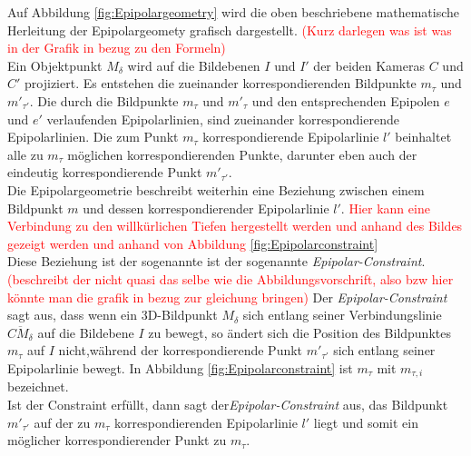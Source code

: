 Auf Abbildung \ref{fig:Epipolargeometry} wird die oben beschriebene mathematische Herleitung der Epipolargeomety grafisch dargestellt.  \textcolor{red}{(Kurz darlegen was ist was in der Grafik in bezug zu den Formeln)}\\

Ein Objektpunkt $M_\delta$ wird auf die Bildebenen $I$ und $I'$ der beiden Kameras $C$ und $C'$ projiziert. Es entstehen die zueinander korrespondierenden Bildpunkte $m_\tau$ und $m'_{\tau'}$. Die durch die Bildpunkte $m_\tau$ und $m'_{\tau}$ und den entsprechenden Epipolen $e$ und $e'$ verlaufenden Epipolarlinien, sind zueinander korrespondierende Epipolarlinien. Die zum Punkt $m_\tau$ korrespondierende Epipolarlinie $l'$ beinhaltet alle zu $m_\tau$ möglichen korrespondierenden Punkte, darunter eben auch der eindeutig korrespondierende Punkt $m'_{\tau'}$.\\

 Die Epipolargeometrie beschreibt weiterhin eine Beziehung zwischen einem Bildpunkt $m$ und dessen korrespondierender Epipolarlinie $l'$. \textcolor{red}{Hier kann eine Verbindung zu den willkürlichen Tiefen hergestellt werden und anhand des Bildes gezeigt werden und anhand von Abbildung \ref{fig:Epipolarconstraint}} \\
 
Diese Beziehung ist der sogenannte ist der sogenannte \textit{Epipolar-Constraint}\cite{HZ,Zhang2014,ZZGXr}.  \textcolor{red}{(beschreibt der nicht quasi das selbe wie die Abbildungsvorschrift, also bzw hier könnte man die grafik in bezug zur gleichung bringen)}
Der \textit{Epipolar-Constraint} sagt aus, dass wenn ein 3D-Bildpunkt $M_\delta$ sich entlang seiner Verbindungslinie $\overline{CM_\delta}$ auf die Bildebene $I$ zu bewegt, so ändert sich die Position des Bildpunktes $m_\tau$ auf $I$ nicht,während der korrespondierende Punkt $m'_{\tau'}$ sich entlang seiner Epipolarlinie bewegt. In Abbildung \ref{fig:Epipolarconstraint} ist $m_\tau$ mit $m_{\tau,i}$ bezeichnet. \\
Ist der Constraint erfüllt, dann sagt der\textit{Epipolar-Constraint} aus, das Bildpunkt  $m'_{\tau'}$ auf der zu $m_\tau$ korrespondierenden Epipolarlinie $l'$ liegt und somit ein möglicher korrespondierender Punkt zu $m_\tau$\cite{HZ,Zhang2014,Elements,ZZGXr}.\\

